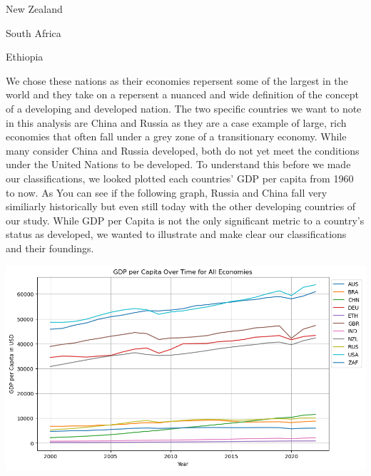 \documentclass[
  letterpaper,
  DIV=11,
  numbers=noendperiod]{scrartcl}
\begin{document}
\n      

New Zealand

\n      

South Africa

\n    

\n    

\n      

\n      

Ethiopia

\n    

\n    

\n      

\n      

\n    

\n  

\n

We chose these nations as their economies repersent some of the largest
in the world and they take on a repersent a nuanced and wide definition
of the concept of a developing and developed nation. The two specific
countries we want to note in this analysis are China and Russia as they
are a case example of large, rich economies that often fall under a grey
zone of a transitionary economy. While many consider China and Russia
developed, both do not yet meet the conditions under the United Nations
to be developed. To understand this before we made our classifications,
we looked plotted each countries' GDP per capita from 1960 to now. As
You can see if the following graph, Russia and China fall very
similiarly historically but even still today with the other developing
countries of our study. While GDP per Capita is not the only significant
metric to a country's status as developed, we wanted to illustrate and
make clear our classifications and their foundings.

\includegraphics[width=1\textwidth,height=\textheight]{figures/GDP_per_Capita_Over_Time_for_All_Economies.png}
\end{document}
